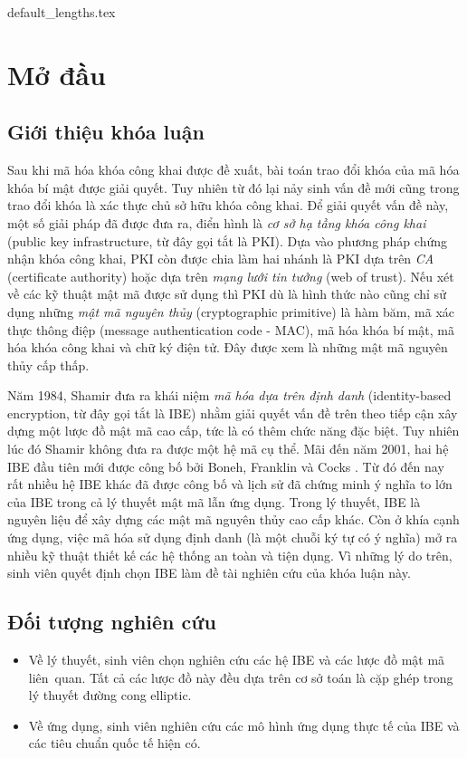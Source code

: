 \documentclass[class=report, crop=false]{standalone}
\begin{document}
	{default_lengths.tex}
	\chapter{Mở đầu}
	\section{Giới thiệu khóa luận}
		Sau khi mã hóa khóa công khai được đề xuất, bài toán trao đổi khóa của mã hóa khóa bí mật được giải quyết. Tuy nhiên từ đó lại nảy sinh vấn đề mới cũng trong trao đổi khóa là xác thực chủ sở hữu khóa công khai. Để giải quyết vấn đề này, một số giải pháp đã được đưa ra, điển hình là \textit{cơ sở hạ tầng khóa công khai} (public key infrastructure, từ đây gọi tắt là PKI). Dựa vào phương pháp chứng nhận khóa công khai, PKI còn được chia làm hai nhánh là PKI dựa trên \textit{CA} (certificate authority) hoặc dựa trên \textit{mạng lưới tin tưởng} (web of trust). Nếu xét về các kỹ thuật mật mã được sử dụng thì PKI dù là hình thức nào cũng chỉ sử dụng những \textit{mật mã nguyên thủy} (cryptographic primitive) là hàm băm, mã xác thực thông điệp (message authentication code - MAC), mã hóa khóa bí mật, mã hóa khóa công khai và chữ ký điện tử. Đây được xem là những mật mã nguyên thủy cấp thấp.

		Năm 1984, Shamir \cite{DBLP:conf/crypto/Shamir84} đưa ra khái niệm \textit{mã hóa dựa trên định danh} (identity-based encryption, từ đây gọi tắt là IBE) nhằm giải quyết vấn đề trên theo tiếp cận xây dựng một lược đồ mật mã cao cấp, tức là có thêm chức năng đặc biệt. Tuy nhiên lúc đó Shamir không đưa ra được một hệ mã cụ thể. Mãi đến năm 2001, hai hệ IBE đầu tiên mới được công bố bởi Boneh, Franklin \cite{DBLP:conf/crypto/BonehF01} và Cocks \cite{DBLP:conf/ima/Cocks01}. Từ đó đến nay rất nhiều hệ IBE khác đã được công bố và lịch sử đã chứng minh ý nghĩa to lớn của IBE trong cả lý thuyết mật mã lẫn ứng dụng. Trong lý thuyết, IBE là nguyên liệu để xây dựng các mật mã nguyên thủy cao cấp khác. Còn ở khía cạnh ứng dụng, việc mã hóa sử dụng định danh (là một chuỗi ký tự có ý nghĩa) mở ra nhiều kỹ thuật thiết kế các hệ thống an toàn và tiện dụng. Vì những lý do trên, sinh viên quyết định chọn IBE làm đề tài nghiên cứu của khóa luận này.
	\section{Đối tượng nghiên cứu}
		\begin{itemize}
			\item Về lý thuyết, sinh viên chọn nghiên cứu các hệ IBE và các lược đồ mật mã liên~quan. Tất cả các lược đồ này đều dựa trên cơ sở toán là cặp ghép trong lý thuyết đường cong elliptic.
			\item Về ứng dụng, sinh viên nghiên cứu các mô hình ứng dụng thực tế của IBE và các tiêu chuẩn quốc tế hiện có.
		\end{itemize}
\end{document}
